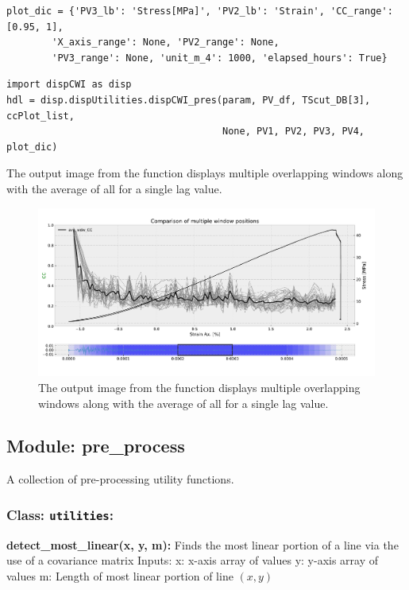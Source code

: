 \documentclass{article}
\begin{document}
\begin{lstlisting}[basicstyle=\small, frame=single]
plot_dic = {'PV3_lb': 'Stress[MPa]', 'PV2_lb': 'Strain', 'CC_range': [0.95, 1],
		'X_axis_range': None, 'PV2_range': None, 
		'PV3_range': None, 'unit_m_4': 1000, 'elapsed_hours': True}
\end{lstlisting}

\begin{lstlisting}[basicstyle=\small, frame=single]
import dispCWI as disp
hdl = disp.dispUtilities.dispCWI_pres(param, PV_df, TScut_DB[3], ccPlot_list,
                                      None, PV1, PV2, PV3, PV4, plot_dic)
\end{lstlisting}

The output image from the function displays multiple overlapping windows along with the average of all for a single lag value.

\begin{figure}[hbt]
  \includegraphics[width=150mm,scale=0.6]{Multi_wdw}
  \caption{The output image from the function displays multiple overlapping windows along with the average of all for a single lag value.}
\end{figure}

	\subsection{Module: pre\_process} 
	A collection of pre-processing utility functions.
		\subsubsection{Class: \texttt{utilities}:}
	\textbf{detect\_most\_linear(x, y, m):}\newline
        Finds the most linear portion of a line via the use of a covariance matrix\newline
        Inputs: \newline
        x: x-axis array of values\newline
        y: y-axis array of values\newline
        m: Length of most linear portion of line $(x, y)$\newline
\end{document}
